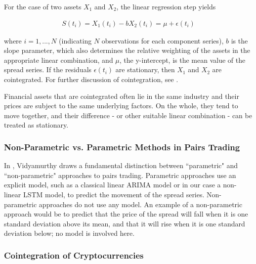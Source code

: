 \documentclass{article}
\begin{document}
\noindent For the case of two assets $X_{1}$ and $X_{2}$, the linear regression step yields 

\begin{align}
S(t_{i}) = X_{1}(t_{i}) - b X_{2}(t_{i}) = \mu + \epsilon(t_{i})
\end{align}

\noindent where $i = 1, ..., N$ (indicating $N$ observations for each component series), $b$ is the slope parameter, which also determines the relative weighting of the assets in the appropriate linear combination, and $\mu$, the y-intercept, is the mean value of the spread series. If the residuals $\epsilon(t_{i})$ are stationary, then $X_{1}$ and $X_{2}$ are cointegrated. For further discussion of cointegration, see \cite{vidyamurthy2004pairs}. 

Financial assets that are cointegrated often lie in the same industry and their prices are subject to the same underlying factors. On the whole, they tend to move together, and their difference - or other suitable linear combination - can be treated as stationary. 



\subsubsection{Non-Parametric vs. Parametric Methods in Pairs Trading}

In \cite{vidyamurthy2004pairs}, Vidyamurthy draws a fundamental distinction between ``parametric" and ``non-parametric" approaches to pairs trading. Parametric approaches use an explicit model, such as a classical linear ARIMA model or in our case a non-linear LSTM model, to predict the movement of the spread series. Non-parametric approaches do not use any model. An example of a non-parametric approach would be to predict that the price of the spread will fall when it is one standard deviation above its mean, and that it will rise when it is one standard deviation below; no model is involved here. 

\subsubsection{Cointegration of Cryptocurrencies}
\end{document}
